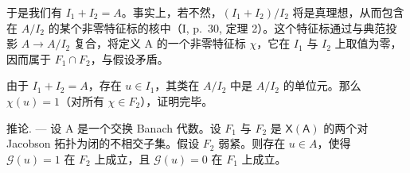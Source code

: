 于是我们有 \(I_{1} + I_{2} = A\)。事实上，若不然，\((I_{1} + I_{2})/I_{2}\) 将是真理想，从而包含在 \(A/I_{2}\) 的某个非零特征标的核中（I, p.~30, 定理 2）。这个特征标通过与典范投影 \(A \rightarrow A/I_{2}\) 复合，将定义 A 的一个非零特征标 \(\chi\)，它在 \(I_{1}\) 与 \(I_{2}\) 上取值为零，因而属于 \(F_{1} \cap F_{2}\)，与假设矛盾。

由于 \(I_{1} + I_{2} = A\)，存在 \(u \in I_{1}\)，其类在 \(A/I_{2}\) 中是 \(A/I_{2}\) 的单位元。那么 \(\chi(u) = 1\)（对所有 \(\chi \in F_{2}\)），证明完毕。

推论. --- 设 A 是一个交换 Banach 代数。设 \(F_{1}\) 与 \(F_{2}\) 是 \(\mathsf{X}(\mathsf{A})\) 的两个对 Jacobson 拓扑为闭的不相交子集。假设 \(F_{2}\) 弱紧。则存在 \(u \in A\)，使得 \(\mathcal{G}(u) = 1\) 在 \(F_{2}\) 上成立，且 \(\mathcal{G}(u) = 0\) 在 \(F_{1}\) 上成立。

